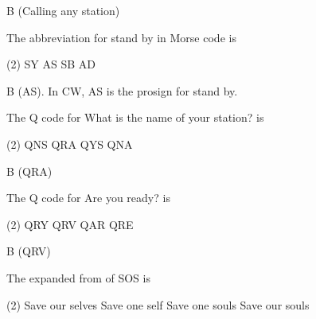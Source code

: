\documentclass[a4paper]{article}
\begin{document}
\begin{solution}
	B (Calling any station)
\end{solution}

\vspace{5mm}



\begin{question}The abbreviation for \apostrophe{}stand by\apostrophe{} in Morse code is
	\begin{tasks}(2)
		\task SY
		\task AS
		\task SB
		\task AD
	\end{tasks}
\end{question}

\begin{solution}
	B (AS). In CW, AS is the prosign for \apostrophe{}stand by\apostrophe{}.
\end{solution}

\vspace{5mm}



\begin{question}The Q code for \apostrophe{}What is the name of your station?\apostrophe{} is
	\begin{tasks}(2)
		\task QNS
		\task QRA
		\task QYS
		\task QNA
	\end{tasks}
\end{question}

\begin{solution}
	B (QRA)
\end{solution}

\vspace{5mm}



\begin{question}The Q code for \apostrophe{}Are you ready?\apostrophe{} is
	\begin{tasks}(2)
		\task QRY
		\task QRV
		\task QAR
		\task QRE
	\end{tasks}
\end{question}

\begin{solution}
	B (QRV)
\end{solution}

\vspace{5mm}



\begin{question}The expanded from of SOS is
	\begin{tasks}(2)
		\task Save our selves
		\task Save one self
		\task Save one souls
		\task Save our souls
	\end{tasks}
\end{question}
\end{document}
